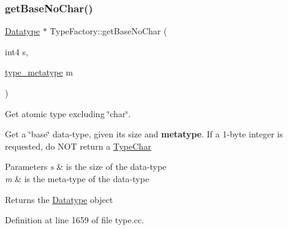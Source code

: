 \subsubsection{\texorpdfstring{getBaseNoChar()}{getBaseNoChar()}}
{\footnotesize\ttfamily \mbox{\hyperlink{class_datatype}{Datatype}} $\ast$ Type\+Factory\+::get\+Base\+No\+Char (\begin{DoxyParamCaption}\item[{int4}]{s,  }\item[{\mbox{\hyperlink{type_8hh_aef6429f2523cdf4d415ba04a0209e61f}{type\+\_\+metatype}}}]{m }\end{DoxyParamCaption})}



Get atomic type excluding \char`\"{}char\char`\"{}. 

Get a \char`\"{}base\char`\"{} data-\/type, given its size and {\bfseries{metatype}}. If a 1-\/byte integer is requested, do N\+OT return a \mbox{\hyperlink{class_type_char}{Type\+Char}} 
\begin{DoxyParams}{Parameters}
{\em s} & is the size of the data-\/type \\
\hline
{\em m} & is the meta-\/type of the data-\/type \\
\hline
\end{DoxyParams}
\begin{DoxyReturn}{Returns}
the \mbox{\hyperlink{class_datatype}{Datatype}} object 
\end{DoxyReturn}


Definition at line 1659 of file type.\+cc.

